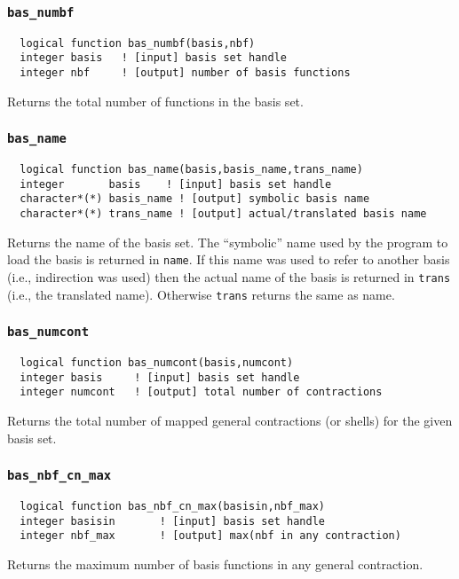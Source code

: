 \subsubsection{{\tt bas\_numbf}}
\begin{verbatim}
  logical function bas_numbf(basis,nbf)
  integer basis   ! [input] basis set handle         
  integer nbf     ! [output] number of basis functions
\end{verbatim}
Returns the total number of functions in the basis set.

\subsubsection{{\tt bas\_name}}
\begin{verbatim}
  logical function bas_name(basis,basis_name,trans_name)
  integer       basis    ! [input] basis set handle
  character*(*) basis_name ! [output] symbolic basis name
  character*(*) trans_name ! [output] actual/translated basis name
\end{verbatim}
Returns the name of the basis set.  The ``symbolic'' name used by the
program to load the basis is returned in {\tt name}.  If this name was
used to refer to another basis (i.e., indirection was used) then the
actual name of the basis is returned in {\tt trans} (i.e., the
translated name).  Otherwise {\tt trans} returns the same as name.

\subsubsection{{\tt bas\_numcont}}
\begin{verbatim}
  logical function bas_numcont(basis,numcont)
  integer basis     ! [input] basis set handle
  integer numcont   ! [output] total number of contractions
\end{verbatim}
Returns the total number of mapped general contractions (or shells)
for the given basis set.

\subsubsection{{\tt bas\_nbf\_cn\_max}}
\begin{verbatim}
  logical function bas_nbf_cn_max(basisin,nbf_max)
  integer basisin       ! [input] basis set handle
  integer nbf_max       ! [output] max(nbf in any contraction)
\end{verbatim}
Returns the maximum number of basis functions in any general contraction.

